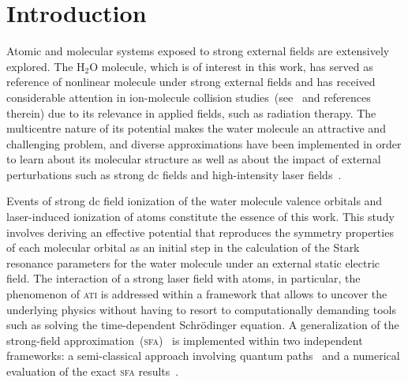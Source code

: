 \chapter{Introduction}
\label{cha:introduction}


Atomic and molecular systems exposed to strong external fields are
extensively explored. The H$_{2}$O molecule, which is of interest in
this work, has served as reference of nonlinear molecule under strong
external fields and has received considerable attention in
ion-molecule collision
studies~(see~\cite{horbatsch_2012col,illescas_2013} and references
therein) due to its relevance in applied fields, such as radiation
therapy.  The multicentre nature of its potential makes the water
molecule an attractive and challenging problem, and diverse
approximations have been implemented in order to learn about its
molecular structure as well as about the impact of external
perturbations such as strong dc fields and high-intensity laser
fields~\cite{Jagau_manybody_H2O,Toru_weakF_H2O,Krause2015_CAP_H2O,Zhao_2011_H2Otunneling,Petretti_H2O_laser}.


Events of strong dc field ionization of the water molecule valence
orbitals and laser-induced ionization of atoms constitute the essence
of this work. This study involves deriving an effective potential that
reproduces the symmetry properties of each molecular orbital as an
initial step in the calculation of the Stark resonance parameters for
the water molecule under an external static electric field.
The interaction of a strong laser field with atoms, in particular, the
phenomenon of \textsc{ati} is addressed within a framework that allows
to uncover the underlying physics without having to resort to
computationally demanding tools such as solving the time-dependent
Schr\"{o}dinger equation. A generalization of the strong-field
approximation~(\textsc{sfa})~\cite{KeldyshSFA} is implemented within
two independent frameworks: a semi-classical approach involving
quantum paths~\cite{KopoldOptComm2000} and a numerical evaluation of
the exact \textsc{sfa} results~\cite{Kopold_1997sfa}.



